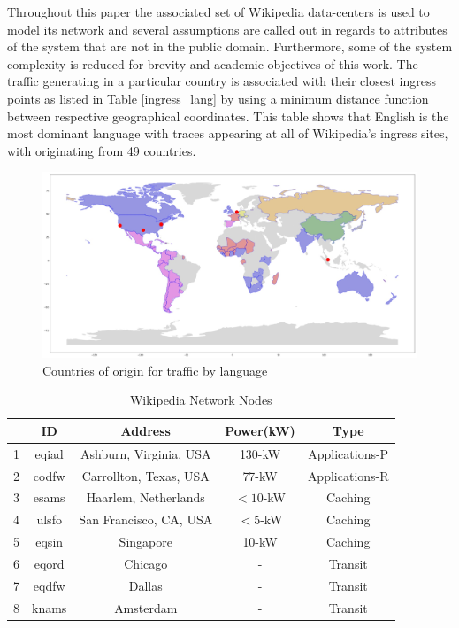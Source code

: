 \documentclass[conference]{IEEEtran}
\begin{document}
Throughout this paper the associated set of Wikipedia data-centers is used to model its network and several assumptions are called out in regards to attributes of the system that are not in the public domain. Furthermore, some of the system complexity is reduced for brevity and academic objectives of this work. The traffic generating in a particular country is associated with their closest ingress points as listed in Table \ref{ingress_lang} by using a minimum distance function between respective geographical coordinates. This table shows that English is the most dominant language with traces appearing at all of Wikipedia's ingress sites, with originating from 49 countries.

\begin{figure}[htbp]
\centering
\includegraphics[scale=.15] {world.eps}
\caption{Countries of origin for traffic by language}
\label{world}
\end{figure}

\begin{table}[htbp]
\caption{Wikipedia Network Nodes}
\begin{center}
	\begin{tabular}{|c|c|c|c|c|}
		\hline
	{} &         ID &  Address                  & Power(kW) & Type \\
		\hline
	1 &       eqiad &  Ashburn, Virginia, USA   & 130-kW    & Applications-P \\
	2 &       codfw &  Carrollton, Texas, USA   & 77-kW     & Applications-R  \\
	3 &       esams &  Haarlem, Netherlands     & $<10$-kW  & Caching  \\
	4 &       ulsfo &  San Francisco, CA, USA   & $<5$-kW   & Caching  \\
	5 &       eqsin &  Singapore                & 10-kW     & Caching \\
	6 &       eqord &  Chicago                  & -         & Transit \\
	7 &       eqdfw &  Dallas                   & -         & Transit \\
	8 &       knams &  Amsterdam                & -         & Transit \\
		\hline
\end{tabular}
\label{wiki_dc}

\end{center}
\end{table} 
\end{document}
